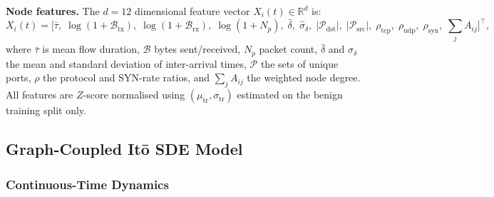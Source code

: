\textbf{Node features.}
The $d\!=\!12$ dimensional feature vector $X_i(t) \in \mathbb{R}^d$ is:
\begin{equation}\label{eq:feat}
X_i(t) = \bigl[
    \bar{\tau},\;
    \log(1{+}\mathcal{B}_{\mathrm{tx}}),\;
    \log(1{+}\mathcal{B}_{\mathrm{rx}}),\;
    \log(1{+}N_p),\;
    \bar{\delta},\;
    \hat{\sigma}_\delta,\;
    |\mathcal{P}_{\mathrm{dst}}|,\;
    |\mathcal{P}_{\mathrm{src}}|,\;
    \rho_{\mathrm{tcp}},\;
    \rho_{\mathrm{udp}},\;
    \rho_{\mathrm{syn}},\;
    \textstyle\sum_j A_{ij}
\bigr]^\top,
\end{equation}
where $\bar{\tau}$ is mean flow duration, $\mathcal{B}$ bytes sent/received,
$N_p$ packet count, $\bar{\delta}$ and $\hat{\sigma}_\delta$ the mean and
standard deviation of inter-arrival times, $\mathcal{P}$ the sets of unique
ports, $\rho$ the protocol and SYN-rate ratios, and $\sum_j A_{ij}$ the
weighted node degree.
All features are $Z$-score normalised using $(\mu_\mathrm{tr},
\sigma_\mathrm{tr})$ estimated on the benign training split only.

\subsection{Graph-Coupled It\=o SDE Model}
\label{sec:sde}

\subsubsection{Continuous-Time Dynamics}

